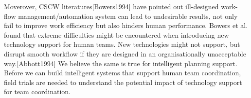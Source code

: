 Moverover, CSCW literatures[Bowers1994] have pointed out ill-designed work-flow management/automation system can lead to undesirable results, not only fail to improve work efficiency but also hinders human performance. Bowers et al. found that extreme difficulties might be encountered when introducing new technology support for human teams. New technologies might not support, but  disrupt smooth workflow if they are designed in an organisationally unacceptable way.[Abbott1994] We believe the same is true for intelligent planning support. Before we can build intelligent systems that support human team coordination, field trials are needed to understand the potential impact of technology support for team coordination. 




